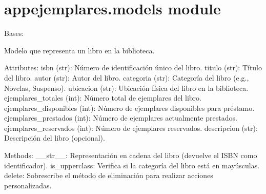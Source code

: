 \documentclass[letterpaper,10pt,spanish]{sphinxmanual}
\begin{document}
\section{appejemplares.models module}
\label{\detokenize{modules/appejemplares:module-appejemplares.models}}\label{\detokenize{modules/appejemplares:appejemplares-models-module}}

\begin{fulllineitems}
\label{\detokenize{modules/appejemplares:appejemplares.models.Libro}}
\pysigstartsignatures
{}
\pysigstopsignatures
\sphinxAtStartPar
Bases: 

\sphinxAtStartPar
Modelo que representa un libro en la biblioteca.

\sphinxAtStartPar
Attributes:
\sphinxhyphen{} isbn (str): Número de identificación único del libro.
\sphinxhyphen{} titulo (str): Título del libro.
\sphinxhyphen{} autor (str): Autor del libro.
\sphinxhyphen{} categoria (str): Categoría del libro (e.g., Novelas, Suspenso).
\sphinxhyphen{} ubicacion (str): Ubicación física del libro en la biblioteca.
\sphinxhyphen{} ejemplares\_totales (int): Número total de ejemplares del libro.
\sphinxhyphen{} ejemplares\_disponibles (int): Número de ejemplares disponibles para préstamo.
\sphinxhyphen{} ejemplares\_prestados (int): Número de ejemplares actualmente prestados.
\sphinxhyphen{} ejemplares\_reservados (int): Número de ejemplares reservados.
\sphinxhyphen{} descripcion (str): Descripción del libro (opcional).

\sphinxAtStartPar
Methods:
\sphinxhyphen{} \_\_str\_\_: Representación en cadena del libro (devuelve el ISBN como identificador).
\sphinxhyphen{} is\_upperclass: Verifica si la categoría del libro está en mayúsculas.
\sphinxhyphen{} delete: Sobrescribe el método de eliminación para realizar acciones personalizadas.


\end{fulllineitems}
\end{document}
